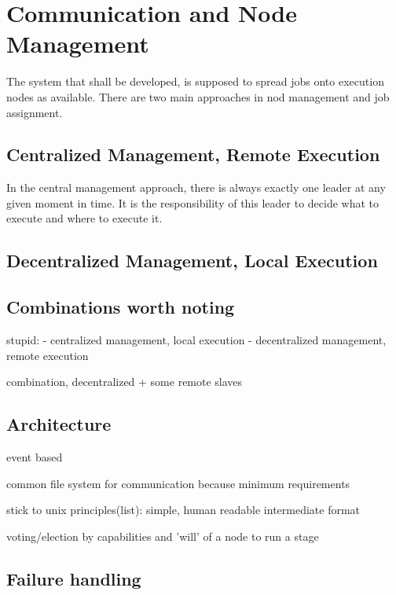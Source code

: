 \section{Communication and Node Management}

The system that shall be developed, is supposed to spread jobs onto execution nodes as available.
There are two main approaches in nod management and job assignment.



\subsection{Centralized Management, Remote Execution}

In the central management approach, there is always exactly one leader at any given moment in time.
It is the responsibility of this leader to decide what to execute and where to execute it.

\subsection{Decentralized Management, Local Execution}

\subsection{Combinations worth noting}

stupid:
 - centralized management, local execution
 - decentralized management, remote execution
 
combination, decentralized + some remote slaves

\subsection{Architecture}

event based

common file system for communication because minimum requirements

stick to unix principles(list): simple, human readable intermediate format

voting/election by capabilities and 'will' of a node to run a stage



\subsection{Failure handling}

